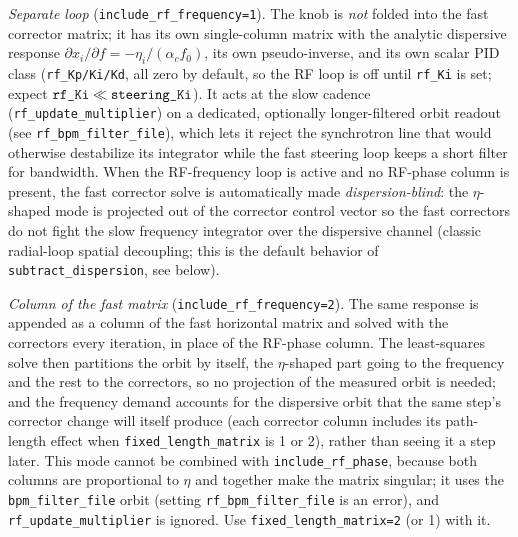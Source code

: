 \documentclass[11pt]{article}
\begin{document}
\emph{Separate loop} (\verb|include_rf_frequency=1|).  The knob is \emph{not} folded into the
fast corrector matrix; it has its own single-column matrix with the analytic dispersive response
$\partial x_i/\partial f=-\eta_i/(\alpha_c f_0)$, its own pseudo-inverse, and its own scalar
PID class (\verb|rf_Kp/Ki/Kd|, all zero by default, so the RF loop is off until \verb|rf_Ki|
is set; expect $\verb|rf_Ki|\ll\verb|steering_Ki|$).  It acts at the slow cadence
(\verb|rf_update_multiplier|) on a dedicated, optionally longer-filtered orbit readout (see
\verb|rf_bpm_filter_file|), which lets it reject the synchrotron line that would otherwise
destabilize its integrator while the fast steering loop keeps a short filter for bandwidth.
When the RF-frequency loop is active and no RF-phase column is present, the fast corrector
solve is automatically made \emph{dispersion-blind}: the $\eta$-shaped mode is projected out
of the corrector control vector so the fast correctors do not fight the slow frequency
integrator over the dispersive channel (classic radial-loop spatial decoupling; this is the
default behavior of \verb|subtract_dispersion|, see below).

\emph{Column of the fast matrix} (\verb|include_rf_frequency=2|).  The same response is
appended as a column of the fast horizontal matrix and solved with the correctors every
iteration, in place of the RF-phase column.  The least-squares solve then partitions the orbit
by itself, the $\eta$-shaped part going to the frequency and the rest to the correctors, so no
projection of the measured orbit is needed; and the frequency demand accounts for the
dispersive orbit that the same step's corrector change will itself produce (each corrector
column includes its path-length effect when \verb|fixed_length_matrix| is 1 or 2), rather than
seeing it a step later.  This mode cannot be combined with \verb|include_rf_phase|, because both
columns are proportional to $\eta$ and together make the matrix singular; it uses the
\verb|bpm_filter_file| orbit (setting \verb|rf_bpm_filter_file| is an error), and
\verb|rf_update_multiplier| is ignored.  Use \verb|fixed_length_matrix=2| (or 1) with it.
\end{document}

